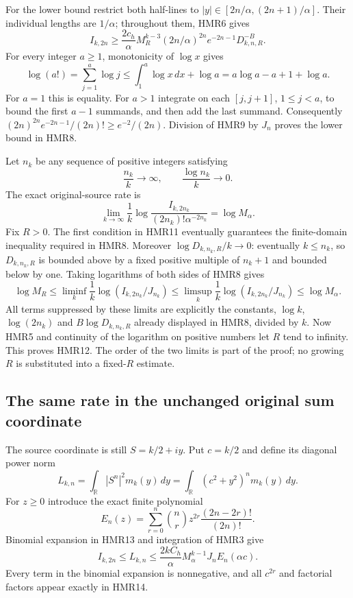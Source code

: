 For the lower bound restrict both half-lines to
$|y|\in[2n/\alpha,(2n+1)/\alpha]$. Their individual lengths
are $1/\alpha$; throughout them, HMR6 gives
\[
 I_{k,2n}\geq
 \frac{2c_h}{\alpha}M_R^{k-3}
       (2n/\alpha)^{2n}e^{-2n-1}D_{k,n,R}^{-B}.
 \tag{HMR9}
\]
For every integer $a\geq1$, monotonicity of $\log x$ gives
\[
 \log(a!)=\sum_{j=1}^a\log j
 \leq\int_1^a\log x\,dx+\log a
 =a\log a-a+1+\log a.
 \tag{HMR10}
\]
For $a=1$ this is equality. For $a>1$ integrate on each
$[j,j+1]$, $1\leq j<a$, to bound the first $a-1$
summands, and then add the last summand. Consequently
$(2n)^{2n}e^{-2n-1}/(2n)!\geq e^{-2}/(2n)$.
Division of HMR9 by $J_n$ proves the lower bound in HMR8.

Let $n_k$ be any sequence of positive integers satisfying
\[
 \frac{n_k}{k}\longrightarrow\infty,\qquad
 \frac{\log n_k}{k}\longrightarrow0.
 \tag{HMR11}
\]
The exact original-source rate is
\[
 \boxed{\displaystyle
 \lim_{k\to\infty}\frac1k
 \log\frac{I_{k,2n_k}}{(2n_k)!\alpha^{-2n_k}}
 =\log M_\alpha.}
 \tag{HMR12}
\]
Fix $R>0$. The first condition in HMR11 eventually guarantees
the finite-domain inequality required in HMR8.
Moreover $\log D_{k,n_k,R}/k\to0$: eventually $k\leq n_k$,
so $D_{k,n_k,R}$ is bounded above by a fixed positive
multiple of $n_k+1$ and bounded below by one.
Taking logarithms of both sides of HMR8 gives
\[
 \log M_R\leq
 \liminf_k\frac1k\log(I_{k,2n_k}/J_{n_k})
 \leq\limsup_k\frac1k\log(I_{k,2n_k}/J_{n_k})
 \leq\log M_\alpha.
\]
All terms suppressed by these limits are explicitly the
constants, $\log k$, $\log(2n_k)$ and $B\log D_{k,n_k,R}$
already displayed in HMR8, divided by $k$.
Now HMR5 and continuity of the logarithm on positive numbers
let $R$ tend to infinity. This proves HMR12. The order of the
two limits is part of the proof; no growing $R$ is substituted
into a fixed-$R$ estimate.

\subsection{The same rate in the unchanged original sum coordinate}

The source coordinate is still $S=k/2+iy$. Put $c=k/2$ and
define its diagonal power norm
\[
 L_{k,n}=\int_{\mathbb R}|S^n|^2m_k(y)\,dy
        =\int_{\mathbb R}(c^2+y^2)^n m_k(y)\,dy.
 \tag{HMR13}
\]
For $z\geq0$ introduce the exact finite polynomial
\[
 E_n(z)=\sum_{r=0}^n
   \binom nr z^{2r}\frac{(2n-2r)!}{(2n)!}.
 \tag{HMR14}
\]
Binomial expansion in HMR13 and integration of HMR3 give
\[
 I_{k,2n}\leq L_{k,n}
 \leq\frac{2kC_h}{\alpha}M_\alpha^{k-1}J_nE_n(\alpha c).
 \tag{HMR15}
\]
Every term in the binomial expansion is nonnegative, and all
$c^{2r}$ and factorial factors appear exactly in HMR14.

